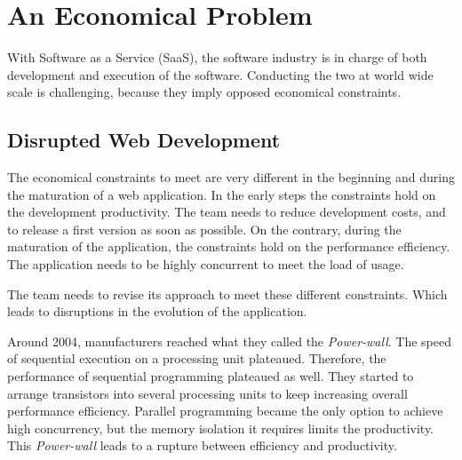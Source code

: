 \section{An Economical Problem} \label{chapter2:problem-statement}

With Software as a Service (SaaS), the software industry is in charge of both development and execution of the software.
Conducting the two at world wide scale is challenging, because they imply opposed economical constraints.

\subsection{Disrupted Web Development}

The economical constraints to meet are very different in the beginning and during the maturation of a web application.
In the early steps the constraints hold on the development productivity.
The team needs to reduce development costs, and to release a first version as soon as possible.
On the contrary, during the maturation of the application, the constraints hold on the performance efficiency.
The application needs to be highly concurrent to meet the load of usage.

The team needs to revise its approach to meet these different constraints.
Which leads to disruptions in the evolution of the application.



Around 2004, manufacturers reached what they called the \textit{Power-wall}.
The speed of sequential execution on a processing unit plateaued.
Therefore, the performance of sequential programming plateaued as well.
They started to arrange transistors into several processing units to keep increasing overall performance efficiency.
Parallel programming became the only option to achieve high concurrency, but the memory isolation it requires limits the productivity.
This \textit{Power-wall} leads to a rupture between efficiency and productivity.

